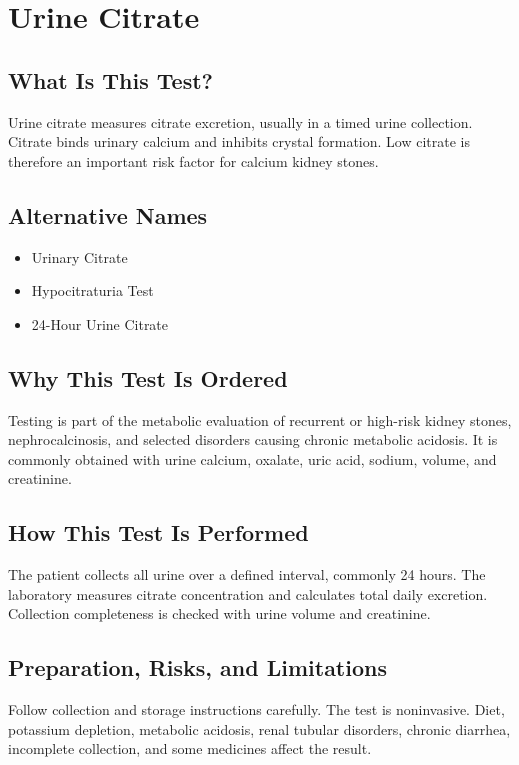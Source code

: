 \chapter{Urine Citrate}

\section*{What Is This Test?}
Urine citrate measures citrate excretion, usually in a timed urine collection. Citrate binds urinary calcium and inhibits crystal formation. Low citrate is therefore an important risk factor for calcium kidney stones.

\section*{Alternative Names}
\begin{itemize}
  \item Urinary Citrate
  \item Hypocitraturia Test
  \item 24-Hour Urine Citrate
\end{itemize}
\section*{Why This Test Is Ordered}
Testing is part of the metabolic evaluation of recurrent or high-risk kidney stones, nephrocalcinosis, and selected disorders causing chronic metabolic acidosis. It is commonly obtained with urine calcium, oxalate, uric acid, sodium, volume, and creatinine.

\section*{How This Test Is Performed}
The patient collects all urine over a defined interval, commonly 24 hours. The laboratory measures citrate concentration and calculates total daily excretion. Collection completeness is checked with urine volume and creatinine.

\section*{Preparation, Risks, and Limitations}
Follow collection and storage instructions carefully. The test is noninvasive. Diet, potassium depletion, metabolic acidosis, renal tubular disorders, chronic diarrhea, incomplete collection, and some medicines affect the result.


